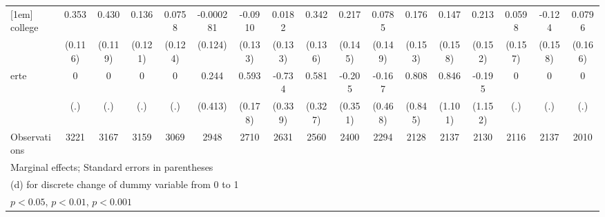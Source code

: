 {\begin{tabular}{l*{16}{c}}
[1em]
college             &       0.353\sym{**} &       0.430\sym{***}&       0.136         &      0.0758         &   -0.000281         &     -0.0910         &      0.0182         &       0.342\sym{*}  &       0.217         &      0.0785         &       0.176         &       0.147         &       0.213         &      0.0598         &      -0.124         &      0.0796         \\
                    &     (0.116)         &     (0.119)         &     (0.121)         &     (0.124)         &     (0.124)         &     (0.133)         &     (0.133)         &     (0.136)         &     (0.145)         &     (0.149)         &     (0.153)         &     (0.158)         &     (0.152)         &     (0.157)         &     (0.158)         &     (0.166)         \\
[1em]
erte                &           0         &           0         &           0         &           0         &       0.244         &       0.593\sym{***}&      -0.734\sym{*}  &       0.581         &      -0.205         &      -0.167         &       0.808         &       0.846         &      -0.195         &           0         &           0         &           0         \\
                    &         (.)         &         (.)         &         (.)         &         (.)         &     (0.413)         &     (0.178)         &     (0.339)         &     (0.327)         &     (0.351)         &     (0.468)         &     (0.845)         &     (1.101)         &     (1.152)         &         (.)         &         (.)         &         (.)         \\
\hline
Observations        &        3221         &        3167         &        3159         &        3069         &        2948         &        2710         &        2631         &        2560         &        2400         &        2294         &        2128         &        2137         &        2130         &        2116         &        2137         &        2010         \\
\hline\hline
\multicolumn{17}{l}{\footnotesize Marginal effects; Standard errors in parentheses}\\
\multicolumn{17}{l}{\footnotesize  (d) for discrete change of dummy variable from 0 to 1}\\
\multicolumn{17}{l}{\footnotesize \sym{*} \(p<0.05\), \sym{**} \(p<0.01\), \sym{***} \(p<0.001\)}\\
\end{tabular}
}
